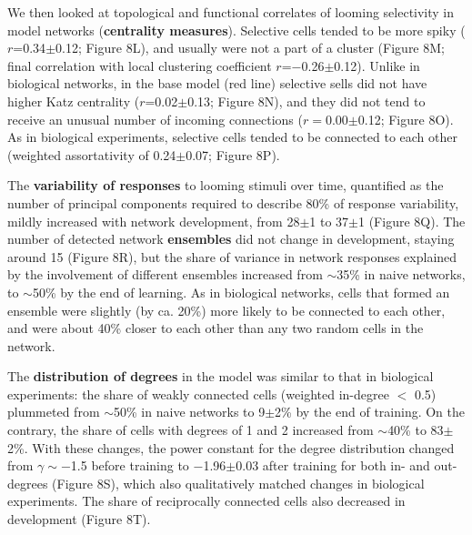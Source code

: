 \documentclass{article}
\begin{document}
We then looked at topological and functional correlates of looming selectivity in model networks (\textbf{centrality measures}). Selective cells tended to be more spiky ($r$=0.34$\pm$0.12; Figure 8L), and usually were not a part of a cluster (Figure 8M; final correlation with local clustering coefficient $r$=$-$0.26$\pm$0.12). Unlike in biological networks, in the base model (red line) selective sells did not have higher Katz centrality ($r$=0.02$\pm$0.13; Figure 8N), and they did not tend to receive an unusual number of incoming connections ($r=$0.00$\pm$0.12; Figure 8O). As in biological experiments, selective cells tended to be connected to each other (weighted assortativity of 0.24$\pm$0.07; Figure 8P). %

The \textbf{variability of responses} to looming stimuli over time, quantified as the number of principal components required to describe 80\% of response variability, mildly increased with network development, from 28$\pm$1 to 37$\pm$1 (Figure 8Q). The number of detected network \textbf{ensembles} did not change in development, staying around 15 (Figure 8R), but the share of variance in network responses explained by the involvement of different ensembles increased from $\sim$35\% in naive networks, to $\sim$50\% by the end of learning. As in biological networks, cells that formed an ensemble were slightly (by ca. 20\%) more likely to be connected to each other, and were about 40\% closer to each other than any two random cells in the network.

The \textbf{distribution of degrees} in the model was similar to that in biological experiments: the share of weakly connected cells (weighted in-degree $<$ 0.5) plummeted from $\sim$50\% in naive networks to 9$\pm$2\% by the end of training. On the contrary, the share of cells with degrees of 1 and 2 increased from $\sim$40\% to 83$\pm$2\%. With these changes, the power constant for the degree distribution changed from $\gamma \sim -$1.5 before training to $-$1.96$\pm$0.03 after training for both in- and out-degrees (Figure 8S), which also qualitatively matched changes in biological experiments. The share of reciprocally connected cells also decreased in development (Figure 8T).
\end{document}
